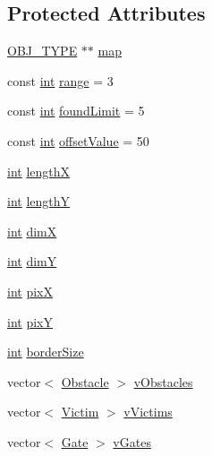 \subsection*{Protected Attributes}
\begin{DoxyCompactItemize}
\item 
\mbox{\hyperlink{map_8hh_a714b9c2c276fbae637fee36453d9121e}{O\+B\+J\+\_\+\+T\+Y\+PE}} $\ast$$\ast$ \mbox{\hyperlink{class_mapp_a91181e95875bc82d03e832b9d901cb59}{map}}
\item 
const \mbox{\hyperlink{draw_8hh_aa620a13339ac3a1177c86edc549fda9b}{int}} \mbox{\hyperlink{class_mapp_a849c2e12fc303e4f35e39602a86bbca7}{range}} = 3
\item 
const \mbox{\hyperlink{draw_8hh_aa620a13339ac3a1177c86edc549fda9b}{int}} \mbox{\hyperlink{class_mapp_acbe12d109f5393640f23956295bf1bdc}{found\+Limit}} = 5
\item 
const \mbox{\hyperlink{draw_8hh_aa620a13339ac3a1177c86edc549fda9b}{int}} \mbox{\hyperlink{class_mapp_a7a9008b7100b25833c4aff1753dc8eec}{offset\+Value}} = 50
\item 
\mbox{\hyperlink{draw_8hh_aa620a13339ac3a1177c86edc549fda9b}{int}} \mbox{\hyperlink{class_mapp_add62ddc7c9bf47dcf3dc8916dc58d41c}{lengthX}}
\item 
\mbox{\hyperlink{draw_8hh_aa620a13339ac3a1177c86edc549fda9b}{int}} \mbox{\hyperlink{class_mapp_ad108cf6f9d0fa2f7b24405938dd7f74c}{lengthY}}
\item 
\mbox{\hyperlink{draw_8hh_aa620a13339ac3a1177c86edc549fda9b}{int}} \mbox{\hyperlink{class_mapp_aeb3ba1ee2b2ac64b01a459b85610f524}{dimX}}
\item 
\mbox{\hyperlink{draw_8hh_aa620a13339ac3a1177c86edc549fda9b}{int}} \mbox{\hyperlink{class_mapp_a7d830edb47e7a9b8d2574e53150a906c}{dimY}}
\item 
\mbox{\hyperlink{draw_8hh_aa620a13339ac3a1177c86edc549fda9b}{int}} \mbox{\hyperlink{class_mapp_a0d751ee7f6aacc352c1ffb1bf95c21af}{pixX}}
\item 
\mbox{\hyperlink{draw_8hh_aa620a13339ac3a1177c86edc549fda9b}{int}} \mbox{\hyperlink{class_mapp_a756d60b3d694342b7c75621c8559c00e}{pixY}}
\item 
\mbox{\hyperlink{draw_8hh_aa620a13339ac3a1177c86edc549fda9b}{int}} \mbox{\hyperlink{class_mapp_a396e22007b8acd6231f9bd91d263f84f}{border\+Size}}
\item 
vector$<$ \mbox{\hyperlink{class_obstacle}{Obstacle}} $>$ \mbox{\hyperlink{class_mapp_adfc09e7e4750c47c7a3d2fe2f30241f8}{v\+Obstacles}}
\item 
vector$<$ \mbox{\hyperlink{class_victim}{Victim}} $>$ \mbox{\hyperlink{class_mapp_a3cd9951fd2f55c83de0c9441249b79db}{v\+Victims}}
\item 
vector$<$ \mbox{\hyperlink{class_gate}{Gate}} $>$ \mbox{\hyperlink{class_mapp_ad33044227affb6fc91f1a795ca3fab4a}{v\+Gates}}
\end{DoxyCompactItemize}
